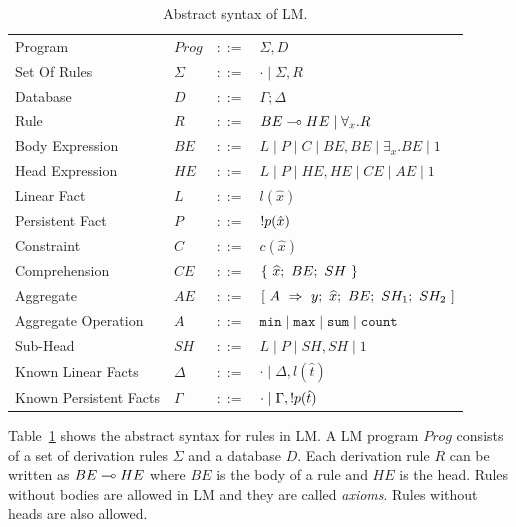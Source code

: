 \renewcommand{\arraystretch}{1.5}
\begin{table}[]
\centering
\begin{tabular}{ l l c l }
  Program & $Prog$ & $::=$ & $\Sigma, D$ \\
  Set Of Rules & $\Sigma$ & $::=$ & $\cdot \; | \; \Sigma, R$\\
  Database & $D$ & $::=$ & $\Gamma; \Delta$ \\
  Rule & $R$ & $::=$ & $BE \multimap HE \; | \; \forall_{x}. R$ \\
  Body Expression & $BE$ & $::=$ & $L \; | \; P \; | \; C \; | \; BE, BE \; | \; \exists_{x}. BE \; | \; 1$\\
  Head Expression & $HE$ & $::=$ & $L \; | \; P \; | \; HE, HE \; | \; CE \; | \; AE \; | \; 1$\\
  
  Linear Fact & $L$ & $::=$ & $l(\hat{x})$\\
  Persistent Fact & $P$ & $::=$ & ${!} p(\hat{x})$\\
  Constraint & $C$ & $::=$ & $c(\hat{x})$ \\
  
  Comprehension & $CE$ & $::=$ & $\{~\widehat{x};~BE;~SH~\}$ \\
  Aggregate & $AE$ & $::=$ & $[~A~\Rightarrow~y;~\widehat{x};~BE;~SH_1;~SH_2~]$ \\
  Aggregate Operation & $A$ & $::=$ & $\mathtt{min} \; | \; \mathtt{max} \; | \; \mathtt{sum} \; | \; \mathtt{count}$ \\
  
  Sub-Head & $SH$ & $::=$ & $L \; | \; P \; | \; SH, SH \; | \; 1$\\
  
  Known Linear Facts & $\Delta$ & $::=$ & $\cdot \; | \; \Delta, l(\hat{t})$ \\
  Known Persistent Facts & $\Gamma$ & $::=$ & $\cdot \; | \; \Gamma, {!} p(\hat{t})$ \\
\end{tabular}
\caption{Abstract syntax of LM.}\label{tbl:ast}
\end{table}
\renewcommand{\arraystretch}{1.0}

Table~\ref{tbl:ast} shows the abstract syntax for rules in LM.
A LM program $Prog$ consists of a set of derivation rules $\Sigma$ and a database $D$.
Each derivation rule $R$ can be written as $BE \multimap HE$ where $BE$ is the body of a rule and
$HE$ is the head. Rules without bodies are allowed in LM and they are called \textit{axioms}. Rules without heads are also allowed.

